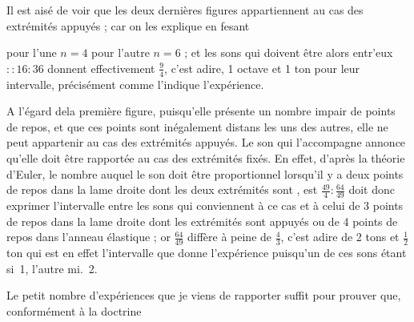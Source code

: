 \documentclass[11pt,a4paper]{article}
\begin{document}
Il est aisé de voir que les deux dernières figures appartiennent
au cas des extrémités appuyés ; car on les explique en fesant



pour l'une $n=4$ pour l'autre $n=6$ ; et les sons qui doivent être
alors entr'eux $::16:36$ donnent effectivement $\frac{9}{4}$, c'est adire,
1 octave et 1 ton pour leur intervalle, précisément comme l'indique
l'expérience.

A l'égard dela première figure, puisqu'elle présente un nombre
impair de points de repos, et que ces points sont inégalement
distans les uns des autres, elle ne peut appartenir au cas
des extrémités appuyés. Le son qui l'accompagne annonce
qu'elle doit être rapportée au cas des extrémités fixés.
En effet, d'après la théorie d'Euler, le nombre auquel le
son doit être proportionnel lorsqu'il y a deux points
de repos dans la lame droite dont les deux
extrémités sont  , est $\frac{49}{4}:\frac{64}{49}$ doit donc exprimer
l'intervalle entre les sons qui conviennent à ce cas
et à celui de 3 points de repos dans la lame droite
dont les extrémités sont appuyés ou de 4 points de
repos dans l'anneau élastique ; or $\frac{64}{49}$ diffère à
peine de $\frac{4}{3}$, c'est adire de 2 tons et $\frac{1}{2}$ ton
qui est en effet l'intervalle que donne l'expérience
puisqu'un de ces sons étant si~1, l'autre 
  mi.~2.

Le petit nombre d'expériences que je viens de rapporter
suffit pour prouver que, conformément à la doctrine


\end{document}
